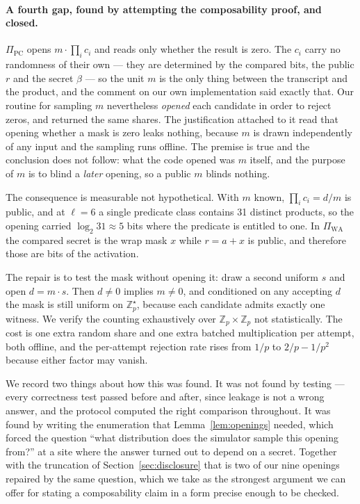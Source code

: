 \documentclass[11pt]{article}
\newcommand{\Z}{\mathbb{Z}}
\begin{document}
\paragraph{A fourth gap, found by attempting the composability proof, and closed.}
\label{sec:pcdisclosure}
$\Pi_{\mathrm{PC}}$ opens $m \cdot \prod_i c_i$ and reads only whether the result is zero. The
$c_i$ carry no randomness of their own --- they are determined by the compared bits, the public
$r$ and the secret $\beta$ --- so the unit $m$ is the only thing between the transcript and the
product, and the comment on our own implementation said exactly that. Our routine for sampling
$m$ nevertheless \emph{opened} each candidate in order to reject zeros, and returned the same
shares. The justification attached to it read that opening whether a mask is zero leaks nothing,
because $m$ is drawn independently of any input and the sampling runs offline. The premise is
true and the conclusion does not follow: what the code opened was $m$ itself, and the purpose of
$m$ is to blind a \emph{later} opening, so a public $m$ blinds nothing.

The consequence is measurable not hypothetical. With $m$ known, $\prod_i c_i = d/m$ is
public, and at $\ell = 6$ a single predicate class contains \num{31} distinct products, so the
opening carried $\log_2 31 \approx 5$ bits where the predicate is entitled to one. In
$\Pi_{\mathrm{WA}}$ the compared secret is the wrap mask $x$ while $r = a + x$ is public, and
therefore those are bits of the activation.

The repair is to test the mask without opening it: draw a second uniform $s$ and open
$d = m\cdot s$. Then $d \neq 0$ implies $m \neq 0$, and conditioned on any accepting $d$ the
mask is still uniform on $\Z_p^\star$, because each candidate admits exactly one witness. We
verify the counting exhaustively over $\Z_p \times \Z_p$ not statistically. The cost is
one extra random share and one extra batched multiplication per attempt, both offline, and the
per-attempt rejection rate rises from $1/p$ to $2/p - 1/p^2$ because either factor may vanish.

We record two things about how this was found. It was not found by testing --- every correctness
test passed before and after, since leakage is not a wrong answer, and the protocol computed the
right comparison throughout. It was found by writing the enumeration that
Lemma~\ref{lem:openings} needed, which forced the question ``what distribution does the
simulator sample this opening from?'' at a site where the answer turned out to depend on a
secret. Together with the truncation of Section~\ref{sec:disclosure} that is two of our nine
openings repaired by the same question, which we take as the strongest argument we can offer for
stating a composability claim in a form precise enough to be checked.
\end{document}
